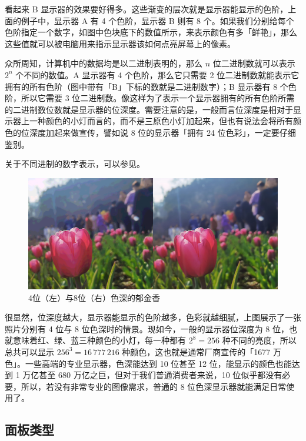 看起来 B 显示器的效果要好得多。这些渐变的层次就是显示器能显示的色阶，上面的例子中，显示器 A 有 4 个色阶，显示器 B 则有 8 个。如果我们分别给每个色阶指定一个数字，如图中色块底下的数值所示，来表示颜色有多「鲜艳」，那么这些值就可以被电脑用来指示显示器该如何点亮屏幕上的像素。

众所周知，计算机中的数据均是以二进制表明的，那么 $n$ 位二进制数就可以表示 $2^n$ 个不同的数值。A 显示器有 4 个色阶，那么它只需要 2 位二进制数就能表示它拥有的所有色阶（图中带有「B」下标的数就是二进制数字）；B 显示器有 8 个色阶，所以它需要 3 位二进制数。像这样为了表示一个显示器拥有的所有色阶所需的二进制数位数就是显示器的位深度。需要注意的是，一般而言位深度是相对于显示器上一种颜色的小灯而言的，而不是三原色小灯加起来，但也有说法会将所有颜色的位深度加起来做宣传，譬如说 8 位的显示器「拥有 24 位色彩」，一定要仔细鉴别。

\begin{note}
  关于不同进制的数字表示，可以参见。
\end{note}

\begin{figure}[htb!]
  \centering
  \includegraphics[width=.85\textwidth]{assets/advanced/4bit_vs_8bit.png}
  \caption{4位（左）与8位（右）色深的郁金香}
  \label{fig:4bit_vs_8bit}
\end{figure}

很显然，位深度越大，显示器能显示的色阶越多，色彩就越细腻，上图展示了一张照片分别有 4 位与 8 位色深时的情景。现如今，一般的显示器位深度为 8 位，也就意味着红、绿、蓝三种颜色的小灯，每一种都有 $2^8 = 256$ 种不同的亮度，所以总共可以显示 $256^3 = 16\,777\,216$ 种颜色，这也就是通常厂商宣传的「1677 万色」。一些高端的专业显示器，色深能达到 10 位甚至 12 位，能显示的颜色也能达到 1 万亿甚至 680 万亿之巨，但对于我们普通消费者来说，10 位似乎都没有必要，所以，若没有非常专业的图像需求，普通的 8 位色深显示器就能满足日常使用了。

\subsection{面板类型}

